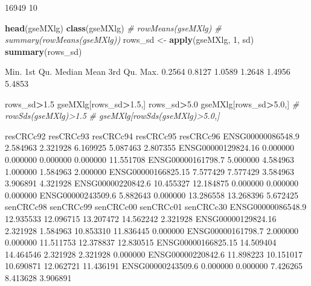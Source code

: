 \documentclass[
]{article}
\newenvironment{Shaded}{\begin{snugshade}}{\end{snugshade}}
\newcommand{\CommentTok}[1]{\textcolor[rgb]{0.56,0.35,0.01}{\textit{#1}}}
\newcommand{\DecValTok}[1]{\textcolor[rgb]{0.00,0.00,0.81}{#1}}
\newcommand{\FloatTok}[1]{\textcolor[rgb]{0.00,0.00,0.81}{#1}}
\newcommand{\FunctionTok}[1]{\textcolor[rgb]{0.13,0.29,0.53}{\textbf{#1}}}
\newcommand{\NormalTok}[1]{#1}
\newcommand{\OtherTok}[1]{\textcolor[rgb]{0.56,0.35,0.01}{#1}}
\newcommand{\SpecialCharTok}[1]{\textcolor[rgb]{0.81,0.36,0.00}{\textbf{#1}}}
\begin{document}
\begin{Shaded}
\begin{Highlighting}[]
\NormalTok{[1] 16949    10}
\end{Highlighting}
\end{Shaded}

\begin{Shaded}
\begin{Highlighting}[]
\FunctionTok{head}\NormalTok{(gseMXlg)}
\FunctionTok{class}\NormalTok{(gseMXlg)}
\CommentTok{\# rowMeans(gseMXlg)}
\CommentTok{\# summary(rowMeans(gseMXlg))}
\NormalTok{rows\_sd }\OtherTok{\textless{}{-}} \FunctionTok{apply}\NormalTok{(gseMXlg, }\DecValTok{1}\NormalTok{, sd)}
\FunctionTok{summary}\NormalTok{(rows\_sd)}
\end{Highlighting}
\end{Shaded}

\begin{Shaded}
\begin{Highlighting}[]
\NormalTok{   Min. 1st Qu.  Median    Mean 3rd Qu.    Max. }
\NormalTok{ 0.2564  0.8127  1.0589  1.2648  1.4956  5.4853}
\end{Highlighting}
\end{Shaded}

\begin{Shaded}
\begin{Highlighting}[]
\NormalTok{rows\_sd}\SpecialCharTok{\textgreater{}}\FloatTok{1.5}
\NormalTok{gseMXlg[rows\_sd}\SpecialCharTok{\textgreater{}}\FloatTok{1.5}\NormalTok{,]}
\NormalTok{rows\_sd}\SpecialCharTok{\textgreater{}}\FloatTok{5.0}
\NormalTok{gseMXlg[rows\_sd}\SpecialCharTok{\textgreater{}}\FloatTok{5.0}\NormalTok{,]}
\CommentTok{\# rowSds(gseMXlg)\textgreater{}1.5}
\CommentTok{\# gseMXlg[rowSds(gseMXlg)\textgreater{}5.0,]}
\end{Highlighting}
\end{Shaded}

\begin{Shaded}
\begin{Highlighting}[]
\NormalTok{                   resCRCc92 resCRCc93 resCRCc94 resCRCc95 resCRCc96}
\NormalTok{ENSG00000086548.9   2.584963  2.321928  6.169925  5.087463  2.807355}
\NormalTok{ENSG00000129824.16  0.000000  0.000000  0.000000  0.000000 11.551708}
\NormalTok{ENSG00000161798.7   5.000000  4.584963  1.000000  1.584963  2.000000}
\NormalTok{ENSG00000166825.15  7.577429  7.577429  3.584963  3.906891  4.321928}
\NormalTok{ENSG00000220842.6  10.455327 12.184875  0.000000  0.000000  0.000000}
\NormalTok{ENSG00000243509.6   5.882643  0.000000 13.286558 13.268396  5.672425}
\NormalTok{                   senCRCc98 senCRCc99 senCRCc00 senCRCc01 senCRCc30}
\NormalTok{ENSG00000086548.9  12.935533 12.096715 13.207472 14.562242  2.321928}
\NormalTok{ENSG00000129824.16  2.321928  1.584963 10.853310 11.836445  0.000000}
\NormalTok{ENSG00000161798.7   2.000000  0.000000 11.511753 12.378837 12.830515}
\NormalTok{ENSG00000166825.15 14.509404 14.464546  2.321928  2.321928  0.000000}
\NormalTok{ENSG00000220842.6  11.898223 10.151017 10.690871 12.062721 11.436191}
\NormalTok{ENSG00000243509.6   0.000000  0.000000  7.426265  8.413628  3.906891}
\end{Highlighting}
\end{Shaded}
\end{document}
